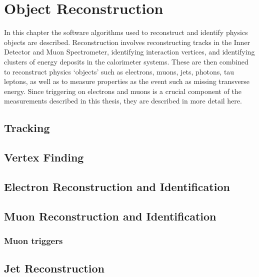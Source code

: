 \graphicspath{{Chapters/Reconstruction/Figures/}}
\label{chap:Reconstruction}
\chapter{Object Reconstruction}

In this chapter the software algorithms used to reconstruct and identify physics
objects are described. Reconstruction involves reconstructing tracks in the
Inner Detector and Muon Spectrometer, identifying interaction vertices,
and identifying clusters of energy deposits in the calorimeter systems. These are
then combined to reconstruct physics `objects' such as electrons, muons, jets, photons,
tau leptons, as well as to measure properties as the event such as missing
transverse energy. 
Since triggering on electrons and muons is a crucial component of the
measurements described in this thesis, they are described in more detail here.

\section{Tracking}
\label{sec:reco-tracking}


\section{Vertex Finding}
\label{sec:reco-vertexing}


\section{Electron Reconstruction and Identification}
\label{sec:reco-el}


\section{Muon Reconstruction and Identification}
\label{sec:reco-mu}

\subsection{Muon triggers}
\label{sec:reco-mu-triggers}

\section{Jet Reconstruction}
\label{sec:reco-jet}

